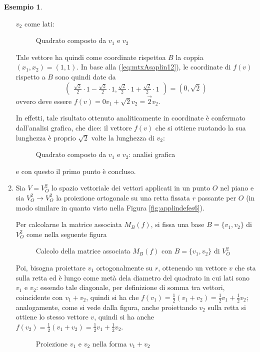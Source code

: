 \documentclass{book}
\theoremstyle{definition}
\newtheorem{es}{Esempio}[section]
\theoremstyle{plain}
\begin{document}
\begin{es}
\begin{enumerate}
    $v_2$ come lati:
    \clearpage
    \begin{figure}[ht!]
      \centering
      \resizebox{5cm}{!}{}
      \caption{Quadrato composto da $v_1$ e $v_2$}
      \label{fig:mtxAsaplin4}
    \end{figure}
    Tale vettore ha quindi come coordinate rispettoa $B$ la coppia $(x_1,x_2)=(1,1)$.
    In base alla (\ref{eq:mtxAsaplin12}), le coordinate di $f(v)$ rispetto a $B$ sono
    quindi date da
    \begin{equation*}
      \begin{pmatrix}
        \frac{\sqrt{2}}{2}\cdot 1 - \frac{\sqrt{2}}{2} \cdot 1,
        \frac{\sqrt{2}}{2} \cdot 1 + \frac{\sqrt{2}}{2}\cdot 1
      \end{pmatrix}
      =(0,\sqrt{2})
    \end{equation*}
    ovvero deve essere $f(v)=0v_1+\sqrt{2}v_2=\vec{2}v_2$.

    In effetti, tale risultato ottenuto analiticamente in coordinate è confermato
    dall'analisi grafica, che dice: il vettore $f(v)$ che si ottiene ruotando la
    sua lunghezza è proprio $\sqrt{2}$ volte la lunghezza di $v_2$:
    \begin{figure}[ht!]
      \centering
      \resizebox{5cm}{!}{}
      \caption{Quadrato composto da $v_1$ e $v_2$: analisi grafica}
      \label{fig:mtxAsaplin4-1}
    \end{figure}
    
    e con questo il primo punto è concluso.
  \item Sia $V=V_O^2$ lo spazio vettoriale dei vettori applicati in un punto $O$
    nel piano e sia $V_O^2\to V_O^2$ la proiezione ortogonale su una retta fissata
    $r$ passante per $O$ (in modo similare in quanto visto nella Figura \ref{fig:applindefes6}).

    Per calcolarne la matrice associata $M_B(f)$, si fissa una base $B=\{v_1,v_2\}$ di $V_O^2$
    come nella seguente figura
    \begin{figure}[ht!]
      \centering
      \resizebox{5cm}{!}{}
      \caption{Calcolo della matrice associata $M_B(f)$ con $B=\{v_1,v_2\}$ di $V_O^2$}
      \label{fig:mtxAsaplin5}
    \end{figure}

    Poi, bisogna proiettare $v_1$ ortogonalmente su $r$, ottenendo un vettore $v$ che
    sta sulla retta ed è lungo come metà dela diametro del quadrato in cui lati sono
    $v_1$ e $v_2$: essendo tale diagonale, per definizione di somma tra vettori,
    coincidente con $v_1+v_2$, quindi si ha che $f(v_1)=\frac{1}{2}(v_1+v_2)=
    \frac{1}{2}v_1+\frac{1}{2}v_2$; analogamente, come si vede dalla figura, anche
    proiettando $v_2$ sulla retta si ottiene lo stesso vettore $v$, quindi si ha
    anche $f(v_2)=\frac{1}{2}(v_1+v_2)=\frac{1}{2}v_1+\frac{1}{2}v_2$.
    \begin{figure}[ht!]
      \centering
      \resizebox{5cm}{!}{}
      \caption{Proiezione $v_1$ e $v_2$ nella forma $v_1+v_2$ }
      \label{fig:mtxAsaplin6}
    \end{figure}
    

\end{enumerate}
\end{es}
\end{document}

